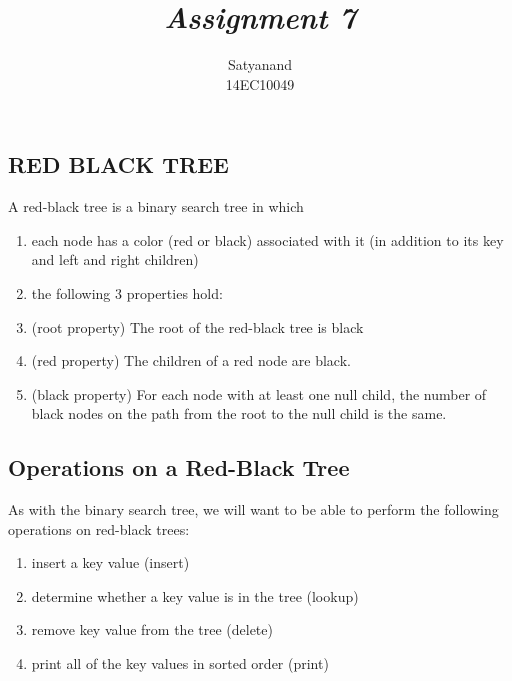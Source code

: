 \documentclass[12pt]{article}
\title{{\it Assignment 7\/} }
\author
{Satyanand\\
14EC10049
}
\date{}
\begin{document}
 
\maketitle



\subsection*{RED BLACK TREE} 
A red-black tree is a binary search tree in which
\begin{enumerate}
	\item each node has a color (red or black) associated with it (in addition to its key and left and right children)
	\item the following 3 properties hold:
	\item (root property) The root of the red-black tree is black
	\item (red property) The children of a red node are black.
	\item (black property) For each node with at least one null child, the number of black nodes on the path from the root to the null child is the same.
\end{enumerate}
\subsection*{Operations on a Red-Black Tree}

As with the binary search tree, we will want to be able to perform the following operations on red-black trees:
\begin{enumerate}
	\item insert a key value (insert)
	\item determine whether a key value is in the tree (lookup)
	\item remove key value from the tree (delete)
	\item print all of the key values in sorted order (print)
\end{enumerate}

\end{document}
